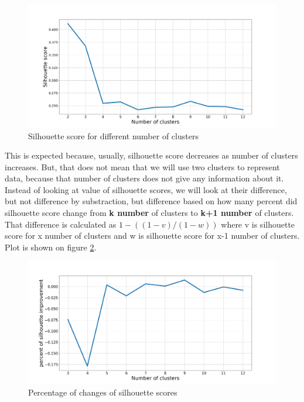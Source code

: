 \documentclass[a4paper]{article}
\begin{document}
\begin{figure}[h!]
\begin{center}
\includegraphics[scale=0.28]{num_of_clusters_shooting.png}
\end{center}
\caption{Silhouette score for different number of clusters}
\label{plt:num_cls_shooting}
\end{figure}

This is expected because, usually, silhouette score decreases as number of clusters increases. But, that does not mean that we will use two clusters to represent data, because that number of clusters does not give any information about it. Instead of looking at value of silhouette scores, we will look at their difference, but not difference by substraction, but difference based on how many percent did silhouette score change from \textbf{k number} of clusters to \textbf{k+1 number} of clusters. That difference is calculated as $ 1 - ((1 - v) / (1 - w)) $ where v is silhouette score for x number of clusters and w is silhouette score for x-1 number of clusters. Plot is shown on figure \ref{plt:num_cls_pct_change}.

\begin{figure}[h!]
\begin{center}
\includegraphics[scale=0.28]{num_of_clusters_shooting_pct_change.png}
\end{center}
\caption{Percentage of changes of silhouette scores}
\label{plt:num_cls_pct_change}
\end{figure}
\end{document}
